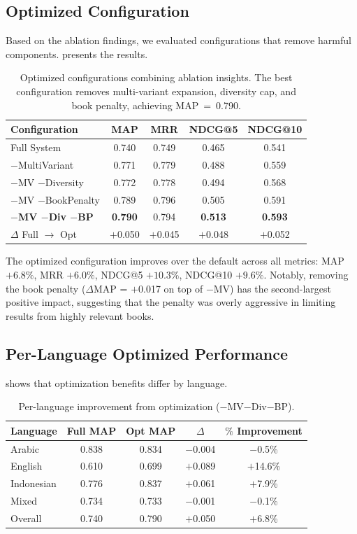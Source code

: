 \documentclass[preprint,12pt,authoryear]{elsarticle}
\begin{document}
\subsection{Optimized Configuration}

Based on the ablation findings, we evaluated configurations that remove harmful components.  presents the results.

\begin{table}[t]
\centering
\caption{Optimized configurations combining ablation insights. The best configuration removes multi-variant expansion, diversity cap, and book penalty, achieving MAP~=~0.790.}
\label{tab:optimized}
\begin{tabular}{lcccc}
\toprule
Configuration & MAP & MRR & NDCG@5 & NDCG@10 \\
\midrule
Full System & 0.740 & 0.749 & 0.465 & 0.541 \\
$-$MultiVariant & 0.771 & 0.779 & 0.488 & 0.559 \\
$-$MV $-$Diversity & 0.772 & 0.778 & 0.494 & 0.568 \\
$-$MV $-$BookPenalty & 0.789 & 0.796 & 0.505 & 0.591 \\
\textbf{$-$MV $-$Div $-$BP} & \textbf{0.790} & 0.794 & \textbf{0.513} & \textbf{0.593} \\
\midrule
$\Delta$ Full $\rightarrow$ Opt & $+$0.050 & $+$0.045 & $+$0.048 & $+$0.052 \\
\bottomrule
\end{tabular}
\end{table}

The optimized configuration improves over the default across all metrics: MAP $+6.8\%$, MRR $+6.0\%$, NDCG@5 $+10.3\%$, NDCG@10 $+9.6\%$. Notably, removing the book penalty ($\Delta$MAP = $+$0.017 on top of $-$MV) has the second-largest positive impact, suggesting that the penalty was overly aggressive in limiting results from highly relevant books.

\subsection{Per-Language Optimized Performance}

 shows that optimization benefits differ by language.

\begin{table}[t]
\centering
\caption{Per-language improvement from optimization ($-$MV$-$Div$-$BP).}
\label{tab:optimized-lang}
\begin{tabular}{lcccc}
\toprule
Language & Full MAP & Opt MAP & $\Delta$ & $\%$ Improvement \\
\midrule
Arabic & 0.838 & 0.834 & $-$0.004 & $-$0.5\% \\
English & 0.610 & 0.699 & $+$0.089 & $+$14.6\% \\
Indonesian & 0.776 & 0.837 & $+$0.061 & $+$7.9\% \\
Mixed & 0.734 & 0.733 & $-$0.001 & $-$0.1\% \\
\midrule
Overall & 0.740 & 0.790 & $+$0.050 & $+$6.8\% \\
\bottomrule
\end{tabular}
\end{table}
\end{document}
